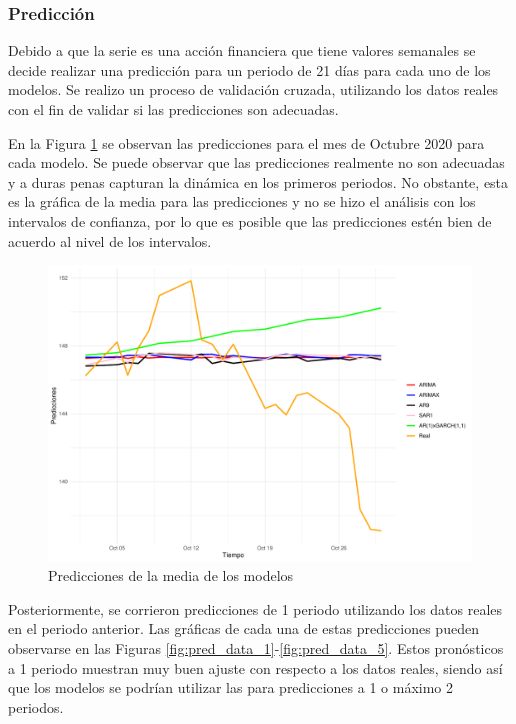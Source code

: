 \documentclass[conference]{IEEEtran}
\begin{document}
\subsubsection{Predicción}
Debido a que la serie es una acción financiera que tiene valores semanales se decide realizar una predicción para un periodo de 21 días para cada uno de los modelos. Se realizo un proceso de validación cruzada, utilizando los datos reales con el fin de validar si las predicciones son adecuadas.

En la Figura \ref{fig:con medias} se observan las predicciones para el mes de Octubre 2020 para cada modelo. Se puede observar que las predicciones realmente no son adecuadas y a duras penas capturan la dinámica en los primeros periodos. No obstante, esta es la gráfica de la media para las predicciones y no se hizo el análisis con los intervalos de confianza, por lo que es posible que las predicciones estén bien de acuerdo al nivel de los intervalos.

\begin{figure}
    \centering
    \includegraphics[width=\columnwidth]{figs/forecast.pdf}
    \caption{Predicciones de la media de los modelos }
    \label{fig:con medias}
\end{figure}

Posteriormente, se corrieron predicciones de 1 periodo utilizando los datos reales en el periodo anterior. Las gráficas de cada una de estas predicciones pueden observarse en las Figuras \ref{fig:pred_data_1}-\ref{fig:pred_data_5}. Estos pronósticos a 1 periodo muestran muy buen ajuste con respecto a los datos reales, siendo así que los modelos se podrían utilizar las para predicciones a 1 o máximo 2 periodos.
\end{document}
